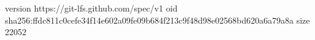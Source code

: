 version https://git-lfs.github.com/spec/v1
oid sha256:ffdc811c0cefe34f14e602a09fe09b684f213c9f48d98e02568bd620a6a79a8a
size 22052
